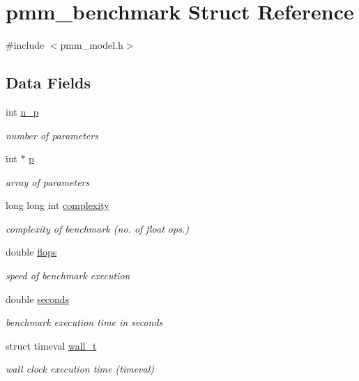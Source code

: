 \hypertarget{structpmm__benchmark}{\section{pmm\-\_\-benchmark Struct Reference}
\label{structpmm__benchmark}
}


{\ttfamily \#include $<$pmm\-\_\-model.\-h$>$}

\subsection*{Data Fields}
\begin{DoxyCompactItemize}
\item 
int \hyperlink{structpmm__benchmark_a3b5f76d33ecae36cacba87717cd393b6}{n\-\_\-p}
\begin{DoxyCompactList}\small\item\em number of parameters \end{DoxyCompactList}\item 
int $\ast$ \hyperlink{structpmm__benchmark_aca03a9b2a577a23fe1c5ade67fe42712}{p}
\begin{DoxyCompactList}\small\item\em array of parameters \end{DoxyCompactList}\item 
long long int \hyperlink{structpmm__benchmark_a7c6fd0e47a41583f4abe721aad76b692}{complexity}
\begin{DoxyCompactList}\small\item\em complexity of benchmark (no. of float ops.) \end{DoxyCompactList}\item 
double \hyperlink{structpmm__benchmark_a28b204369a2e020588b09bb67a442fcb}{flops}
\begin{DoxyCompactList}\small\item\em speed of benchmark execution \end{DoxyCompactList}\item 
double \hyperlink{structpmm__benchmark_a20f884c7d28b5449b300ea4adcdc56c5}{seconds}
\begin{DoxyCompactList}\small\item\em benchmark execution time in seconds \end{DoxyCompactList}\item 
struct timeval \hyperlink{structpmm__benchmark_a0523de7c2b09ca2a96bbee433a567a9e}{wall\-\_\-t}
\begin{DoxyCompactList}\small\item\em wall clock execution time (timeval) \end{DoxyCompactList}\item 

\end{DoxyCompactItemize}
